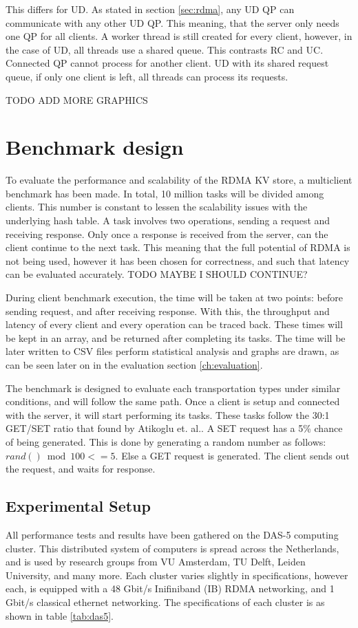 This differs for UD.
As stated in section \ref{sec:rdma}, any UD QP can communicate with any other UD QP.
This meaning, that the server only needs one QP for all clients.
A worker thread is still created for every client, however, in the case of UD, all threads use a shared queue.
This contrasts RC and UC.
Connected QP cannot process for another client.
UD with its shared request queue, if only one client is left, all threads can process its requests.

TODO ADD MORE GRAPHICS


\section{Benchmark design}\label{sec:benchmark-design}
To evaluate the performance and scalability of the RDMA KV store, a multiclient benchmark has been made.
In total, 10 million tasks will be divided among clients.
This number is constant to lessen the scalability issues with the underlying hash table.
A task involves two operations, sending a request and receiving response.
Only once a response is received from the server, can the client continue to the next task.
This meaning that the full potential of RDMA is not being used, however it has been chosen for correctness, and such that latency can be evaluated accurately. TODO MAYBE I SHOULD CONTINUE?

During client benchmark execution, the time will be taken at two points: before sending request, and after receiving response.
With this, the throughput and latency of every client and every operation can be traced back.
These times will be kept in an array, and be returned after completing its tasks.
The time will be later written to CSV files perform statistical analysis and graphs are drawn, as can be seen later on in the evaluation section \ref{ch:evaluation}.

The benchmark is designed to evaluate each transportation types under similar conditions, and will follow the same path.
Once a client is setup and connected with the server, it will start performing its tasks.
These tasks follow the 30:1 GET/SET ratio that found by Atikoglu et. al.\cite{atikoglu2012workload}.
A SET request has a 5\% chance of being generated.
This is done by generating a random number as follows: $rand() \bmod 100 <= 5$.
Else a GET request is generated.
The client sends out the request, and waits for response.

\subsection{Experimental Setup}
All performance tests and results have been gathered on the DAS-5 computing cluster.
This distributed system of computers is spread across the Netherlands, and is used by research groups from VU Amsterdam, TU Delft, Leiden University, and many more.
Each cluster varies slightly in specifications, however each, is equipped with a 48 Gbit/s Inifiniband (IB) RDMA networking, and 1 Gbit/s classical ethernet networking.
The specifications of each cluster is as shown in table \ref{tab:das5}.

